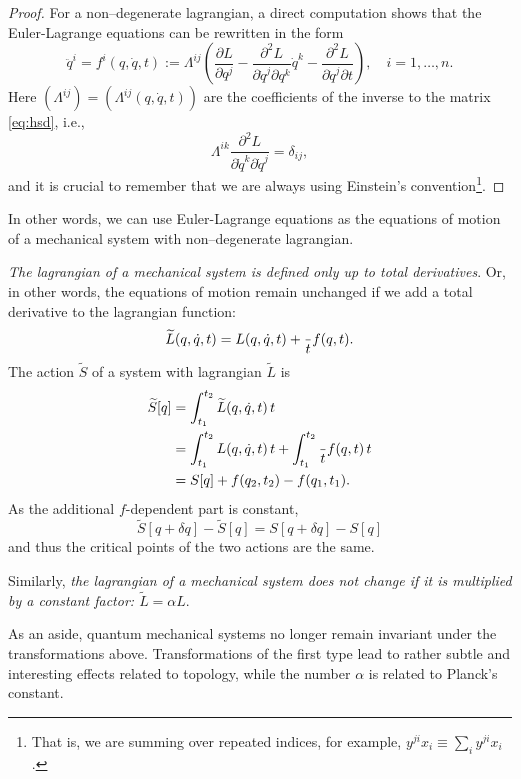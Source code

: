 \documentclass[english,fontsize=11pt,paper=a5,oneside]{scrbook}
\let\d\relax
\newcommand{\d}{\mathrm{d}}
\theoremstyle{definition}
\newenvironment{remark}
  {\pushQED{\qed}\renewcommand{\qedsymbol}{$\lozenge$}\remarkx}
  {\popQED\endremarkx}
\begin{document}
\begin{proof}
  For a non--degenerate lagrangian, a direct computation shows that the Euler-Lagrange equations can be rewritten in the form
  \begin{equation}
    \ddot q^i = f^i(q,\dot q, t)
    := \Lambda^{ij}\left(\frac{\partial L}{\partial q^j} - \frac{\partial^2 L}{\partial \dot q^j \partial q^k} \dot q^k - \frac{\partial^2 L}{\partial\dot q^j \partial t}\right),
    \quad i=1,\ldots,n.
  \end{equation}
  Here $\left(\Lambda^{ij}\right) = \left(\Lambda^{ij}(q, \dot q, t)\right)$ are the coefficients of the inverse to the matrix \eqref{eq:hsd}, i.e.,
  \begin{equation}
    \Lambda^{ik} \frac{\partial^2 L}{\partial \dot q^k \partial \dot q^j} = \delta_{ij},
  \end{equation}
  and it is crucial to remember that we are always using Einstein's convention\footnote{That is, we are summing over repeated indices, for example, $y^{ji} x_i \equiv \sum_i y^{ji} x_i$.}.
\end{proof}

In other words, we can use Euler-Lagrange equations as the equations of motion of a mechanical system with non--degenerate lagrangian.

\begin{remark}\label{rmk:manylagrangians}
  \emph{The lagrangian of a mechanical system is defined only up to total derivatives}.
  Or, in other words, the equations of motion remain unchanged if we add a total derivative to the lagrangian function:
  \begin{equation}
    \widetilde L(q,\dot q, t) = L(q, \dot q, t) + \frac{\d}{\d t} f(q,t).
  \end{equation}
  The action $\widetilde S$ of a system with lagrangian $\widetilde L$ is
  \begin{align}
    \widetilde S[q] & = \int_{t_1}^{t_2} \widetilde L(q, \dot q, t) \,\d t                                       \\
                    & = \int_{t_1}^{t_2} L(q, \dot q, t) \,\d t + \int_{t_1}^{t_2} \frac{\d}{\d t} f(q,t) \,\d t \\
                    & = S[q] + f(q_2, t_2) - f(q_1, t_1).
  \end{align}
  As the additional $f$-dependent part is constant,
  \begin{equation}
    \widetilde S[q+\delta q] - \widetilde S[q]
    = S[q+\delta q] - S[q]
  \end{equation}
  and thus the critical points of the two actions are the same.

  Similarly, \emph{the lagrangian of a mechanical system does not change if it is multiplied by a constant factor: $\widetilde L = \alpha L$}.

  As an aside, quantum mechanical systems no longer remain invariant under the transformations above. Transformations of the first type lead to rather subtle and interesting effects related to topology, while the number $\alpha$ is related to Planck's constant.
\end{remark}
\end{document}
